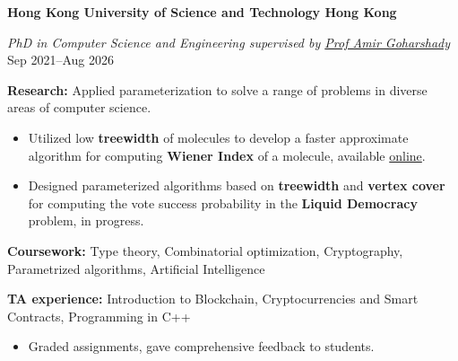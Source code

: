 \textbf{Hong Kong University of Science and Technology \hfill Hong Kong} \par
\textit{PhD in Computer Science and Engineering supervised by \href{https://scholar.google.com/citations?user=4o8gvAYAAAAJ&hl=en&oi=ao}{Prof Amir Goharshady}} \hfill Sep 2021--Aug 2026\par
\textbf{Research:} Applied parameterization to solve a range of problems in diverse areas of computer science.
    \begin{itemize}
        \item Utilized low \textbf{treewidth} of molecules to develop a faster approximate algorithm for computing \textbf{Wiener Index} of a molecule, available \href{https://drops.dagstuhl.de/entities/document/10.4230/LIPIcs.SEA.2024.6}{online}.
        \item Designed parameterized algorithms based on \textbf{treewidth} and \textbf{vertex cover} for computing the vote success probability in the \textbf{Liquid Democracy} problem, in progress.
    \end{itemize} \par
\textbf{Coursework:} Type theory, Combinatorial optimization, Cryptography, Parametrized algorithms, Artificial Intelligence \par
\textbf{TA experience:} Introduction to Blockchain, Cryptocurrencies and Smart Contracts, Programming in C++ 
\begin{itemize}
    \item Graded assignments, gave comprehensive feedback to students.
\end{itemize}

\fi